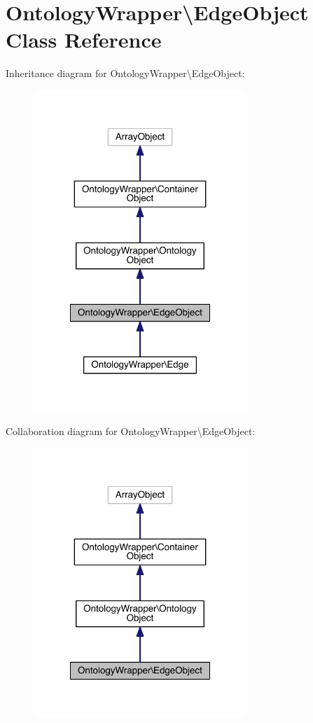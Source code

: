 \hypertarget{class_ontology_wrapper_1_1_edge_object}{\section{Ontology\-Wrapper\textbackslash{}Edge\-Object Class Reference}
\label{class_ontology_wrapper_1_1_edge_object}
}


Inheritance diagram for Ontology\-Wrapper\textbackslash{}Edge\-Object\-:\nopagebreak
\begin{figure}[H]
\begin{center}
\leavevmode
\includegraphics[width=228pt]{class_ontology_wrapper_1_1_edge_object__inherit__graph}
\end{center}
\end{figure}


Collaboration diagram for Ontology\-Wrapper\textbackslash{}Edge\-Object\-:\nopagebreak
\begin{figure}[H]
\begin{center}
\leavevmode
\includegraphics[width=228pt]{class_ontology_wrapper_1_1_edge_object__coll__graph}
\end{center}
\end{figure}
